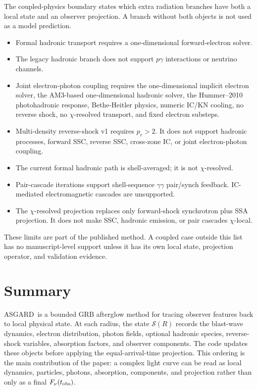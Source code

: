 \documentclass[twocolumn]{aastex702}
\newcommand{\asgard}{\textsc{ASGARD}}
\begin{document}
The coupled-physics boundary states which extra radiation branches have both a
local state and an observer projection.  A branch without both objects is not
used as a model prediction.
\begin{itemize}
\item Formal hadronic transport requires a one-dimensional forward-electron
solver.
\item The legacy hadronic branch does not support \(p\gamma\) interactions or
neutrino channels.
\item Joint electron-photon coupling requires the one-dimensional implicit
electron solver, the AM3-based one-dimensional hadronic solver, the
Hummer--2010 photohadronic response, Bethe-Heitler physics, numeric IC/KN
cooling, no reverse shock, no \(\chi\)-resolved transport, and fixed electron
substeps.
\item Multi-density reverse-shock v1 requires \(p_r>2\).  It does not support
hadronic processes, forward SSC, reverse SSC, cross-zone IC, or joint
electron-photon coupling.
\item The current formal hadronic path is shell-averaged; it is not
\(\chi\)-resolved.
\item Pair-cascade iterations support shell-sequence \(\gamma\gamma\) pair/synch
feedback.  IC-mediated electromagnetic cascades are unsupported.
\item The \(\chi\)-resolved projection replaces only forward-shock synchrotron
plus SSA projection.  It does not make SSC, hadronic emission, or pair cascades
\(\chi\)-local.
\end{itemize}
These limits are part of the published method.  A coupled case outside this list
has no manuscript-level support unless it has its own local state, projection
operator, and validation evidence.

\section{Summary} \label{sec:summary}

\asgard\ is a bounded GRB afterglow method for tracing observer features back to
local physical state.  At each radius, the state \(\mathcal{S}(R)\) records the
blast-wave dynamics, electron distribution, photon fields, optional hadronic
species, reverse-shock variables, absorption factors, and observer components.
The code updates these objects before applying the equal-arrival-time projection.
This ordering is the main contribution of the paper: a complex light curve can be
read as local dynamics, particles, photons, absorption, components, and
projection rather than only as a final \(F_\nu(t_{\rm obs})\).
\end{document}
